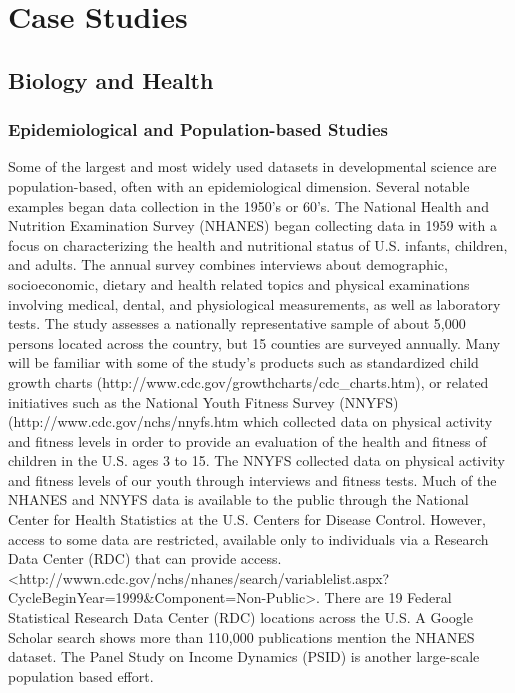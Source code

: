 \documentclass[letterpaper,man,apacite]{apa6}
\begin{document}
\section{Case Studies}
 
\subsection{Biology and Health}

\subsubsection{Epidemiological and Population-based Studies}

Some of the largest and most widely used datasets in developmental science are population-based, often with an epidemiological dimension.
Several notable examples began data collection in the 1950's or 60's.
The National Health and Nutrition Examination Survey (NHANES) \cite{NHANES} began collecting data in 1959 with a focus on characterizing the health and nutritional status of U.S. infants, children, and adults. 
The annual survey combines interviews about demographic, socioeconomic, dietary and health related topics and physical examinations involving medical, dental, and physiological measurements, as well as laboratory tests.
The study assesses a nationally representative sample of about 5,000 persons located across the country, but 15 counties are surveyed annually.
Many will be familiar with some of the study's products such as standardized child growth charts (http://www.cdc.gov/growthcharts/cdc_charts.htm), or related initiatives such as the National Youth Fitness Survey (NNYFS) (http://www.cdc.gov/nchs/nnyfs.htm which collected data on physical activity and fitness levels in order to provide an evaluation of the health and fitness of children in the U.S. ages 3 to 15. 
The NNYFS collected data on physical activity and fitness levels of our youth through interviews and fitness tests.
Much of the NHANES and NNYFS data is available to the public through the National Center for Health Statistics at the U.S. Centers for Disease Control.
However, access to some data are restricted, available only to individuals via a Research Data Center (RDC) that can provide access.
<http://wwwn.cdc.gov/nchs/nhanes/search/variablelist.aspx?CycleBeginYear=1999&Component=Non-Public>.
There are 19 Federal Statistical Research Data Center (RDC) locations across the U.S.
A Google Scholar search shows more than 110,000 publications mention the NHANES dataset.
The Panel Study on Income Dynamics (PSID) \cite{PSID} is another large-scale population based effort.
\end{document}
